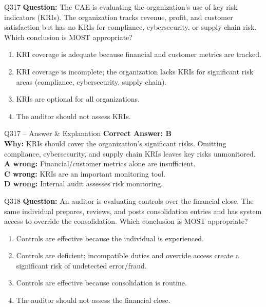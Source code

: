 \documentclass[aspectratio=169,10pt]{beamer}
\begin{document}
	\begin{frame}[t]{Q317}
		\small
		\textbf{Question:} The CAE is evaluating the organization's use of key risk indicators (KRIs). The organization tracks revenue, profit, and customer satisfaction but has no KRIs for compliance, cybersecurity, or supply chain risk. Which conclusion is MOST appropriate?
		\begin{enumerate}[label=\Alph*.,itemsep=1pt,topsep=2pt]
			\item KRI coverage is adequate because financial and customer metrics are tracked.
			\item KRI coverage is incomplete; the organization lacks KRIs for significant risk areas (compliance, cybersecurity, supply chain).
			\item KRIs are optional for all organizations.
			\item The auditor should not assess KRIs.
		\end{enumerate}
	\end{frame}
	
	\begin{frame}[t]{Q317 -- Answer \& Explanation}
		\small
		\textbf{Correct Answer: B} \\[4pt]
		\textbf{Why:} KRIs should cover the organization's significant risks. Omitting compliance, cybersecurity, and supply chain KRIs leaves key risks unmonitored. \\[4pt]
		\textbf{A wrong:} Financial/customer metrics alone are insufficient. \\[2pt]
		\textbf{C wrong:} KRIs are an important monitoring tool. \\[2pt]
		\textbf{D wrong:} Internal audit assesses risk monitoring.
	\end{frame}
	
	\begin{frame}[t]{Q318}
		\small
		\textbf{Question:} An auditor is evaluating controls over the financial close. The same individual prepares, reviews, and posts consolidation entries and has system access to override the consolidation. Which conclusion is MOST appropriate?
		\begin{enumerate}[label=\Alph*.,itemsep=1pt,topsep=2pt]
			\item Controls are effective because the individual is experienced.
			\item Controls are deficient; incompatible duties and override access create a significant risk of undetected error/fraud.
			\item Controls are effective because consolidation is routine.
			\item The auditor should not assess the financial close.
		\end{enumerate}
	\end{frame}
	
\end{document}

